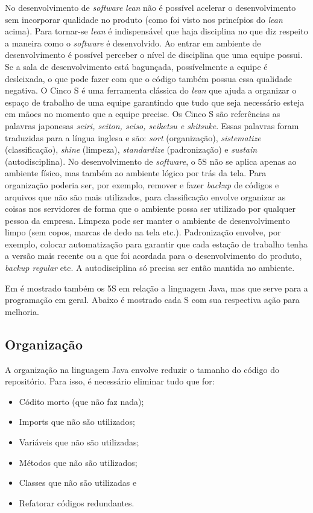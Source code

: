 No desenvolvimento de \textit{software} \textit{lean} não é possível acelerar o desenvolvimento sem incorporar qualidade no produto (como foi visto nos princípios do \textit{lean} acima). Para tornar-se \textit{lean} é indispensável que haja disciplina no que diz respeito a maneira como o \textit{software} é desenvolvido. Ao entrar em ambiente de desenvolvimento é possível perceber o nível de disciplina que uma equipe possui. Se a sala de desenvolvimento está bagunçada, possívelmente a equipe é desleixada, o que pode fazer com que o código também possua essa qualidade negativa. O Cinco S é uma ferramenta clássica do \textit{lean} que ajuda a organizar o espaço de trabalho de uma equipe garantindo que tudo que seja necessário esteja em mãoes no momento que a equipe precise. Os Cinco S são referências as palavras japonesas \textit{seiri, seiton, seiso, seiketsu e shitsuke}. Essas palavras foram traduzidas para a língua inglesa e são: \textit{sort} (organização), \textit{sistematize} (classificação), \textit{shine} (limpeza), \textit{standardize} (padronização) e \textit{sustain} (autodisciplina). No desenvolvimento de \textit{software}, o 5S não se aplica apenas ao ambiente físico, mas também ao ambiente lógico por trás da tela. Para organização poderia ser, por exemplo, remover e fazer \textit{backup} de códigos e arquivos que não são mais utilizados, para classificação envolve organizar as coisas nos servidores de forma que o ambiente possa ser utilizado por qualquer pessoa da empresa. Limpeza pode ser manter o ambiente de desenvolvimento limpo (sem copos, marcas de dedo na tela etc.). Padronização envolve, por exemplo, colocar automatização para garantir que cada estação de trabalho tenha a versão mais recente ou a que foi acordada para o desenvolvimento do produto, \textit{backup regular} etc. A autodisciplina só precisa ser então mantida no ambiente. 


Em  é mostrado também os 5S em relação a linguagem Java, mas que serve para a programação em geral. Abaixo é mostrado cada S com sua respectiva ação para melhoria.

\subsection{Organização}
\label{lean:org}

A organização na linguagem Java envolve reduzir o tamanho do código do repositório. Para isso, é necessário eliminar tudo que for:

\begin{itemize}
	\item Códito morto (que não faz nada);
	\item Imports que não são utilizados;
	\item Variáveis que não são utilizadas;
	\item Métodos que não são utilizados;
	\item Classes que não são utilizadas e
	\item Refatorar códigos redundantes.
\end{itemize}

